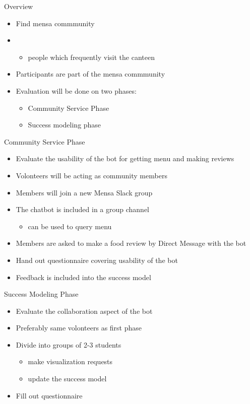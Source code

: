 \begin{frame}{Overview}
  \begin{itemize}
    \item Find mensa commmunity
    \item \begin{itemize}
            \item people which frequently visit the canteen
          \end{itemize}
    \item Participants are part of the mensa commmunity
    \item Evaluation will be done on two phases:
          \begin{itemize}
            \item  Community Service Phase
            \item Success modeling phase
          \end{itemize}
  \end{itemize}
\end{frame}


\begin{frame}{Community Service Phase}
  \begin{itemize}
    \item Evaluate the usability of the bot for getting menu and making reviews
    \item Volonteers will be acting as community members
    \item Members will join a new Mensa Slack group
    \item The chatbot is included in a group channel
          \begin{itemize}
            \item can be used to query menu
          \end{itemize}
    \item Members are asked to make a food review by Direct Message with the bot
    \item Hand out questionnaire covering usability of the bot
    \item Feedback is included into the success model
  \end{itemize}
\end{frame}

\begin{frame}{Success Modeling Phase}
  \begin{itemize}
    \item Evaluate the collaboration aspect of the bot
    \item Preferably same volonteers as first phase %
    \item Divide into groups of 2-3 students
          \begin{itemize}
            \item make visualization requests
            \item update the success model
          \end{itemize}
    \item Fill out questionnaire
  \end{itemize}
\end{frame}

